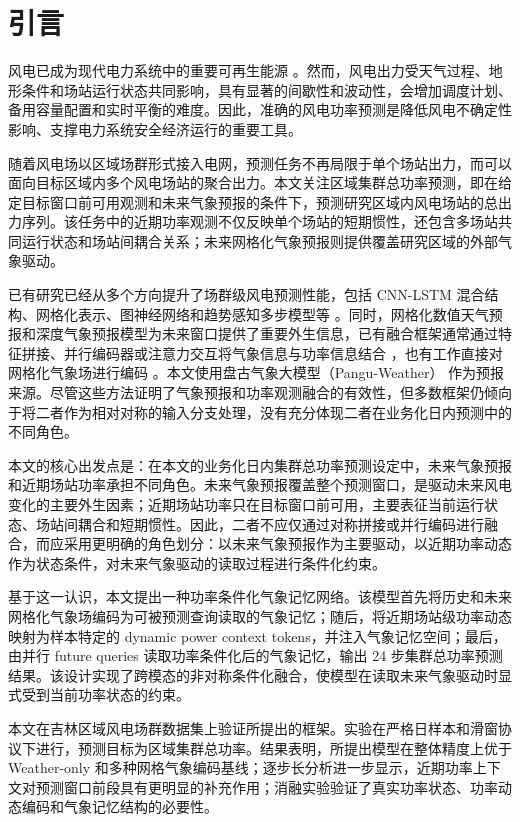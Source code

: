 \section{引言}

风电已成为现代电力系统中的重要可再生能源 \cite{ref1,ref2}。然而，风电出力受天气过程、地形条件和场站运行状态共同影响，具有显著的间歇性和波动性，会增加调度计划、备用容量配置和实时平衡的难度。因此，准确的风电功率预测是降低风电不确定性影响、支撑电力系统安全经济运行的重要工具。

随着风电场以区域场群形式接入电网，预测任务不再局限于单个场站出力，而可以面向目标区域内多个风电场站的聚合出力。本文关注区域集群总功率预测，即在给定目标窗口前可用观测和未来气象预报的条件下，预测研究区域内风电场站的总出力序列。该任务中的近期功率观测不仅反映单个场站的短期惯性，还包含多场站共同运行状态和场站间耦合关系；未来网格化气象预报则提供覆盖研究区域的外部气象驱动。

已有研究已经从多个方向提升了场群级风电预测性能，包括 CNN-LSTM 混合结构、网格化表示、图神经网络和趋势感知多步模型等 \cite{ref1,ref2,ref3,ref4,ref5,ref6,ref7,ref8,ref9,ref10,ref11,ref12}。同时，网格化数值天气预报和深度气象预报模型为未来窗口提供了重要外生信息，已有融合框架通常通过特征拼接、并行编码器或注意力交互将气象信息与功率信息结合 \cite{ref13,ref14,ref15,ref16,ref17,ref18}，也有工作直接对网格化气象场进行编码 \cite{ref19,ref20,ref21}。本文使用盘古气象大模型（Pangu-Weather）\cite{ref22} 作为预报来源。尽管这些方法证明了气象预报和功率观测融合的有效性，但多数框架仍倾向于将二者作为相对对称的输入分支处理，没有充分体现二者在业务化日内预测中的不同角色。

本文的核心出发点是：在本文的业务化日内集群总功率预测设定中，未来气象预报和近期场站功率承担不同角色。未来气象预报覆盖整个预测窗口，是驱动未来风电变化的主要外生因素；近期场站功率只在目标窗口前可用，主要表征当前运行状态、场站间耦合和短期惯性。因此，二者不应仅通过对称拼接或并行编码进行融合，而应采用更明确的角色划分：以未来气象预报作为主要驱动，以近期功率动态作为状态条件，对未来气象驱动的读取过程进行条件化约束。

基于这一认识，本文提出一种功率条件化气象记忆网络。该模型首先将历史和未来网格化气象场编码为可被预测查询读取的气象记忆；随后，将近期场站级功率动态映射为样本特定的 dynamic power context tokens，并注入气象记忆空间；最后，由并行 future queries 读取功率条件化后的气象记忆，输出 24 步集群总功率预测结果。该设计实现了跨模态的非对称条件化融合，使模型在读取未来气象驱动时显式受到当前功率状态的约束。

本文在吉林区域风电场群数据集上验证所提出的框架。实验在严格日样本和滑窗协议下进行，预测目标为区域集群总功率。结果表明，所提出模型在整体精度上优于 Weather-only 和多种网格气象编码基线；逐步长分析进一步显示，近期功率上下文对预测窗口前段具有更明显的补充作用；消融实验验证了真实功率状态、功率动态编码和气象记忆结构的必要性。

